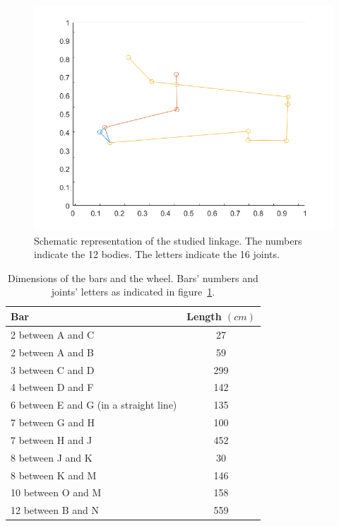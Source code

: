 \documentclass[a4paper]{article}
\begin{document}
\begin{figure}[h]
	\includegraphics[width=\textwidth]{schematic.png}
	\centering
	\caption{Schematic representation of the studied linkage. The numbers indicate the 12 bodies. The letters indicate the 16 joints.}
	\label{fig:schematic}
\end{figure}


\begin{table}[h] 
	\centering
	\begin{tabular}{lc}
		\hline
		Bar & Length \((\si{cm})\) \\
		\hline
		2 between A and C & 27 \\
		2 between A and B & 59 \\
		3 between C and D & 299 \\
		4 between D and F & 142 \\
		6 between E and G (in a straight line) & 135 \\
		7 between G and H & 100 \\
		7 between H and J & 452 \\
		8 between J and K & 30 \\
		8 between K and M & 146 \\
		10 between O and M & 158 \\
		12 between B and N & 559 \\
		\hline
	\end{tabular}
	\caption{Dimensions of the bars and the wheel. Bars' numbers and joints' letters as indicated in figure~\ref{fig:schematic}.}
	\label{tab:dims}
\end{table}
\end{document}
